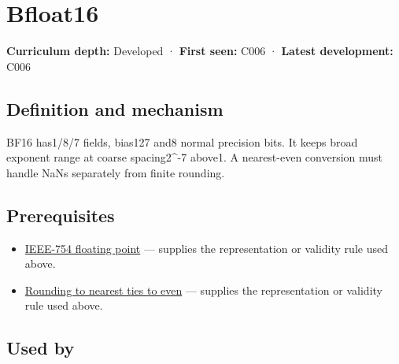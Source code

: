 \hypertarget{appendix-18b8dd966b5d}{}\label{referencestart:appendix-18b8dd966b5d}
\section{Bfloat16}\label{appendix-18b8dd966b5d-bfloat16}

\hypertarget{appendix-18b8dd966b5d-bfloat16}{}

\textbf{Curriculum depth:} Developed · \textbf{First seen:} C006 · \textbf{Latest development:} C006

\begin{allmightroledefinition}

\subsection{Definition and mechanism}\label{appendix-18b8dd966b5d-definition-and-mechanism}

\hypertarget{appendix-18b8dd966b5d-definition-and-mechanism}{}

BF16 has1/8/7 fields, bias127 and8 normal precision bits. It keeps broad exponent range at coarse spacing2\^{}-7 above1. A nearest-even conversion must handle NaNs separately from finite rounding.

\end{allmightroledefinition}

\subsection{Prerequisites}\label{appendix-18b8dd966b5d-prerequisites}

\hypertarget{appendix-18b8dd966b5d-prerequisites}{}

\begin{itemize}
\tightlist
\item
  \hyperref[appendix-343615f49ddf]{IEEE-754 floating point} --- supplies the representation or validity rule used above.
\item
  \hyperref[appendix-614afe1de592]{Rounding to nearest ties to even} --- supplies the representation or validity rule used above.
\end{itemize}

\subsection{Used by}\label{appendix-18b8dd966b5d-used-by}

\hypertarget{appendix-18b8dd966b5d-used-by}{}

